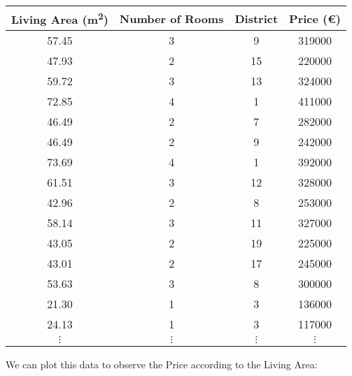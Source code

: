 \begin{center}
\begin{tabular}{|c|c|c|c|}
	\hline
	Living Area (\si{\square\meter}) &  Number of Rooms &  District &  Price (\euro) \\
	\hline
	57.45  & 3  &  9  &  319000  \\
	47.93  & 2  & 15  &  220000  \\
	59.72  & 3  & 13  &  324000  \\
	72.85  & 4  &  1  &  411000  \\
	46.49  & 2  &  7  &  282000  \\
	46.49  & 2  &  9  &  242000  \\
	73.69  & 4  &  1  &  392000  \\
	61.51  & 3  & 12  &  328000  \\
	42.96  & 2  &  8  &  253000  \\
	58.14  & 3  & 11  &  327000  \\
	43.05  & 2  & 19  &  225000  \\
	43.01  & 2  & 17  &  245000  \\
	53.63  & 3  &  8  &  300000  \\
	21.30  & 1  &  3  &  136000  \\
	24.13  & 1  &  3  &  117000  \\
	$\vdots$ & $\vdots$ & $\vdots$ & $\vdots$ \\
\end{tabular}
\end{center}

We can plot this data to observe the Price according to the Living Area:


